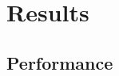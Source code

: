 \documentclass{beamer}
\begin{document}
%
%				

\section{Results}
\subsection{Performance}
%
\end{document}
